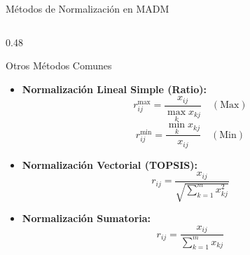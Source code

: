 \documentclass[aspectratio=169, 10pt]{beamer}
\begin{document}
\begin{frame}{Métodos de Normalización en MADM}
\begin{columns}[T]
        \begin{column}{0.48\textwidth}
            \begin{exampleblock}{Otros Métodos Comunes}
                \scriptsize
                \begin{itemize}
                    \item \textbf{Normalización Lineal Simple (Ratio):}
                        \begin{equation*}
                            r_{ij}^{\text{max}} = \frac{x_{ij}}{\max_k x_{kj}} \quad (\text{Max})
                        \end{equation*}
                        \begin{equation*}
                            r_{ij}^{\text{min}} = \frac{\min_k x_{kj}}{x_{ij}} \quad (\text{Min})
                        \end{equation*}
                    \item \textbf{Normalización Vectorial (TOPSIS):}
                        \begin{equation*}
                            r_{ij} = \frac{x_{ij}}{\sqrt{\sum_{k=1}^m x_{kj}^2}}
                        \end{equation*}
                    \item \textbf{Normalización Sumatoria:}
                        \begin{equation*}
                            r_{ij} = \frac{x_{ij}}{\sum_{k=1}^m x_{kj}}
                        \end{equation*}
                \end{itemize}
            \end{exampleblock}
        \end{column}
    \end{columns}
\end{frame}
\end{document}
